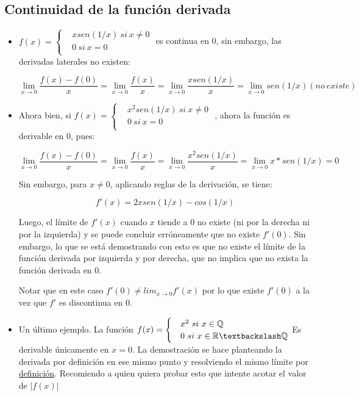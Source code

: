 \documentclass{report}
\begin{document}
		\subsection{Continuidad de la función derivada}
			\begin{itemize}
				\item $f(x)=\begin{cases}
					&xsen(1/x) \ si\ x\neq0 \\
					&0 \ si\ x=0 \\
				\end{cases}$ es continua en 0, sin embargo, las derivadas laterales no existen:
			
				$$\lim_{x \to 0}{\frac{f(x)-f(0)}{x}} = \lim_{x \to 0}{\frac{f(x)}{x}} = \lim_{x \to 0}{\frac{xsen(1/x)}{x}} = \lim_{x \to 0}{sen(1/x)} (no \ existe)$$
				
				\item Ahora bien, si $f(x)=\begin{cases}
					&x^2sen(1/x) \ si\ x\neq0 \\
					&0 \ si\ x=0 \\
				\end{cases}$ , ahora la función es derivable en 0, pues:
			
				$$\lim_{x \to 0}{\frac{f(x)-f(0)}{x}} = \lim_{x \to 0}{\frac{f(x)}{x}} = \lim_{x \to 0}{\frac{x^2sen(1/x)}{x}} = \lim_{x \to 0}{x*sen(1/x)} = 0$$
				
				Sin embargo, para $x\neq 0$, aplicando reglas de la derivación, se tiene:
				
					$$f'(x)=2xsen(1/x)-cos(1/x)$$
					
				Luego, el límite de $f'(x)$ cuando $x$ tiende a 0 no existe (ni por la derecha ni por la izquierda) y se puede concluir erróneamente que no existe $f'(0)$. Sin embargo, lo que se está demostrando con esto es que no existe el límite de la función derivada por izquierda y por derecha, que no implica que no exista la función derivada en 0.
				
				Notar que en este caso $f'(0) \neq lim_{x\to 0}{f'(x)}$ por lo que existe $f'(0)$ a la vez que $f'$ es discontinua en 0.
				
				\item Un último ejemplo. La función $f(x)= \begin{cases}
					&x^2 \ si\ x\in\mathbb{Q} \\
					&0 \ si\ x\in\mathbb{R}\textbackslash \mathbb{Q} \\
				\end{cases}$			
				Es derivable únicamente en $x=0$. La demostración se hace planteando la derivada por definición en ese mismo punto y resolviendo el mismo límite por \hyperref[definicion1]{definición}. Recomiendo a quien quiera probar esto que intente acotar el valor de $|f(x)|$
					
			\end{itemize}
		
\end{document}
